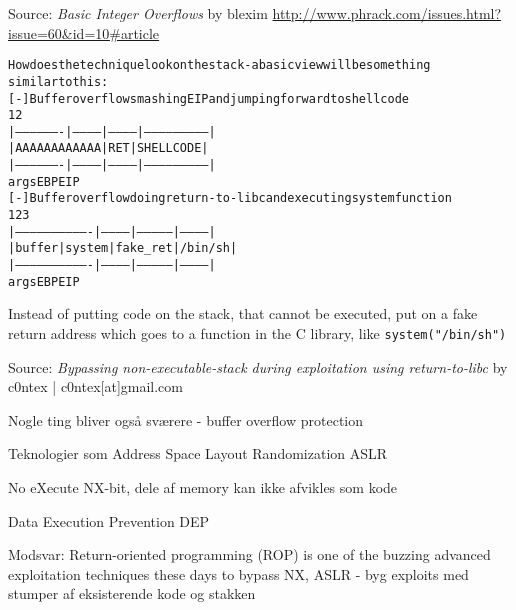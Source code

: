 \documentclass[Screen16to9,17pt]{foils}
\begin{document}
Source:
\emph{Basic Integer Overflows} by blexim
\url{http://www.phrack.com/issues.html?issue=60&id=10#article}



\begin{alltt}\footnotesize
  How does the technique look on the stack - a basic view will be something
  similar to this:
  [-] Buffer overflow smashing EIP and jumping forward to shellcode
                                                   1                    2
  |-------------------|-----------|------------|---------------------------|
  |             AAAAAAAAAAAA      |    RET     |        SHELLCODE          |
  |-------------------|-----------|------------|---------------------------|
                     args              EBP        EIP
  [-] Buffer overflow doing return-to-libc and executing system function
                                                    1             2         3
  |-------------------------------|------------|--------------|------------|
  |            buffer             |   system   |   fake_ret   |   /bin/sh  |
  |-------------------------------|------------|--------------|------------|
                     args               EBP        EIP
\end{alltt}
Instead of putting code on the stack, that cannot be executed, put on a fake return address which goes to a function in the C library, like \verb+system("/bin/sh")+

Source:
\emph{Bypassing non-executable-stack during exploitation using return-to-libc}
 by c0ntex | c0ntex[at]gmail.com


\begin{list1}
\item Nogle ting bliver også sværere - buffer overflow protection
\item Teknologier som Address Space Layout Randomization ASLR\\ 
\item No eXecute NX-bit, dele af memory kan ikke afvikles som kode
\item Data Execution Prevention DEP\\
\item Modsvar: Return-oriented programming (ROP) is one of the buzzing advanced exploitation techniques these days to bypass NX, ASLR - byg exploits med stumper af eksisterende kode og stakken
\end{list1}
\end{document}
